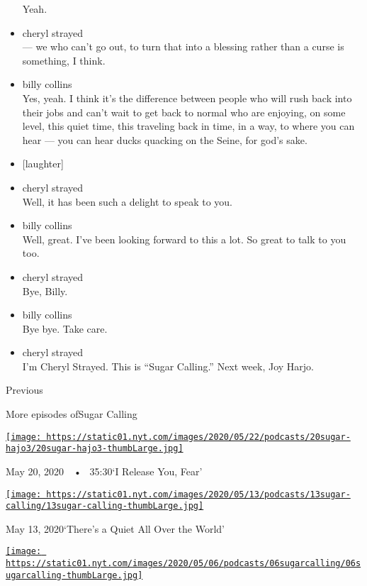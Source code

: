\begin{itemize}
  Yeah.
\item
  cheryl strayed\\
  --- we who can't go out, to turn that into a blessing rather than a
  curse is something, I think.
\item
  billy collins\\
  Yes, yeah. I think it's the difference between people who will rush
  back into their jobs and can't wait to get back to normal who are
  enjoying, on some level, this quiet time, this traveling back in time,
  in a way, to where you can hear --- you can hear ducks quacking on the
  Seine, for god's sake.
\item
  {[}laughter{]}
\item
  cheryl strayed\\
  Well, it has been such a delight to speak to you.
\item
  billy collins\\
  Well, great. I've been looking forward to this a lot. So great to talk
  to you too.
\item
  cheryl strayed\\
  Bye, Billy.
\item
  billy collins\\
  Bye bye. Take care.
\item
  cheryl strayed\\
  I'm Cheryl Strayed. This is ``Sugar Calling.'' Next week, Joy Harjo.
\end{itemize}

Previous

More episodes ofSugar Calling

\href{https://www.nytimes.com/2020/05/20/podcasts/sugar-calling-joy-harjo-poetry-virus.html?action=click\&module=audio-series-bar\&region=header\&pgtype=Article}{\texttt{[image: https://static01.nyt.com/images/2020/05/22/podcasts/20sugar-hajo3/20sugar-hajo3-thumbLarge.jpg]}}

May 20, 2020~~•~ 35:30`I Release You, Fear'

\href{https://www.nytimes.com/2020/05/13/podcasts/sugar-calling-billy-collins-poetry-virus.html?action=click\&module=audio-series-bar\&region=header\&pgtype=Article}{\texttt{[image: https://static01.nyt.com/images/2020/05/13/podcasts/13sugar-calling/13sugar-calling-thumbLarge.jpg]}}

May 13, 2020`There's a Quiet All Over the World'

\href{https://www.nytimes.com/2020/05/06/podcasts/sugar-calling-alice-walker-quarantine-virus.html?action=click\&module=audio-series-bar\&region=header\&pgtype=Article}{\texttt{[image: https://static01.nyt.com/images/2020/05/06/podcasts/06sugarcalling/06sugarcalling-thumbLarge.jpg]}}


